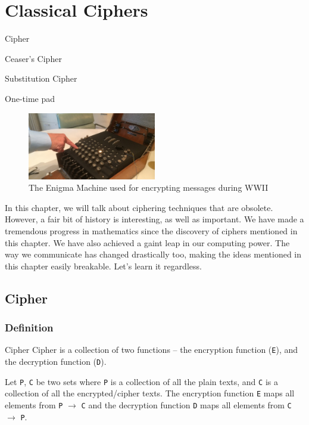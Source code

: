 \chapter{Classical Ciphers}

\begin{introduction}[Contents]
    \item Cipher
    \item Ceaser's Cipher
    \item Substitution Cipher
    \item One-time pad
\end{introduction}

\begin{figure}[h]
    \centering
    \includegraphics[width=0.5\textwidth]{enigma}
    \caption{The Enigma Machine used for encrypting messages during WWII}
\end{figure}

In this chapter, we will talk about ciphering techniques that are obsolete. However, a fair bit of history is interesting, as well as important.
We have made a tremendous progress in mathematics since the discovery of ciphers mentioned in this chapter. We have also achieved a gaint leap in our 
computing power. The way we communicate has changed drastically too, making the ideas mentioned in this chapter easily breakable. Let's learn it regardless.
\newpage

\section{Cipher}

\subsection{Definition}
\begin{definition}{Cipher}{}
Cipher is a collection of two functions -- the encryption function (\verb!E!), and the decryption function (\verb!D!).
\end{definition}
Let \verb!P!, \verb!C! be two sets where \verb!P! is a collection of all the plain texts, and \verb!C! is a collection of all the encrypted/cipher texts.
The encryption function \verb!E! maps all elements from \verb!P! $\rightarrow$ \verb!C! and the decryption function \verb!D! maps all elements from \verb!C!
$\rightarrow$ \verb!P!.

